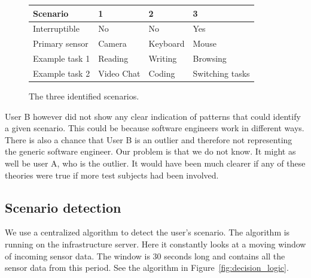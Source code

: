 \documentclass{sigchi}
\begin{document}
\begin{figure}[H]
  \centering
      \begin{tabular}{@{}llll@{}}
      \toprule
      \textbf{Scenario} & \textbf{1} & \textbf{2} & \textbf{3}      \\ \midrule
      Interruptible     & No         & No         & Yes             \\
      Primary sensor    & Camera     & Keyboard   & Mouse           \\
      Example task 1    & Reading    & Writing    & Browsing        \\
      Example task 2    & Video Chat & Coding     & Switching tasks \\ \bottomrule
      \end{tabular}
  \caption{The three identified scenarios.}
  \label{fig:scenarios}
\end{figure}

User B however did not show any clear indication of patterns that could identify a given scenario.
This could be because software engineers work in different ways.
There is also a chance that User B is an outlier and therefore not representing the generic software engineer.
Our problem is that we do not know.
It might as well be user A, who is the outlier.
It would have been much clearer if any of these theories were true if more test subjects had been involved.

\subsection{Scenario detection}
\label{scenario_detection}
We use a centralized algorithm to detect the user's scenario.
The algorithm is running on the infrastructure server.
Here it constantly looks at a moving window of incoming sensor data.
The window is 30 seconds long and contains all the sensor data from this period.
See the algorithm in Figure~\ref{fig:decision_logic}.
\end{document}
